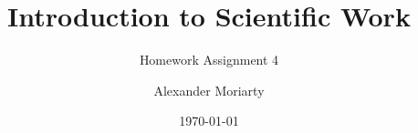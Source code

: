 \documentclass[ngerman,hyperref={pdfpagelabels=false}]{beamer}
\title{Introduction to Scientific Work}
\subtitle{Homework Assignment 4}
\author{Alexander Moriarty}
\institute[Bonn-Rhine-Sieg University of Applied Sciences]{Bonn-Rhine-Sieg University of Applied Sciences}
\date{\today}
\begin{document}
\begin{frame}
    \titlepage
\end{frame}

%
%
\end{document}
